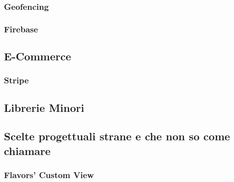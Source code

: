 \subsubsection{Geofencing}

\subsubsection{Firebase}

\subsection{E-Commerce}

\subsubsection{Stripe}

\subsection{Librerie Minori}

\subsection{Scelte progettuali strane e che non so come chiamare}

\subsubsection{Flavors’ Custom View}

\newpage
